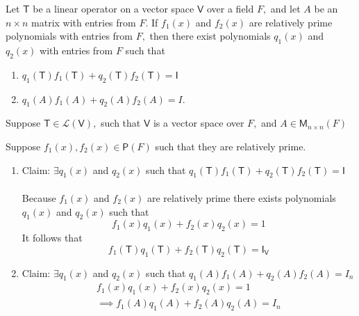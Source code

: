 Let $\mathsf{T}$ be a linear operator on a vector space $\mathsf{V}$
over a field $F,$ and let $A$ be an $n\times n$ matrix with entries
from $F.$ If $f_1(x)$ and $f_2(x)$ are relatively prime polynomials
with entries from $F,$ then there exist polynomials $q_1(x)$ and
$q_2(x)$ with entries from $F$ such that
\begin{enumerate}
\item $q_1(\mathsf{T})f_1(\mathsf{T}) + q_2(\mathsf{T})f_2(\mathsf{T})
  = \mathsf{I}$
\item$q_1(A)f_1(A) + q_2(A)f_2(A) = I.$
\end{enumerate}
Suppose $\mathsf{T} \in \mathcal{L}(\mathsf{V}),$ such that
$\mathsf{V}$ is a vector space over $F,$ and $A\in
\mathsf{M}_{n\times n}(F)$

Suppose $f_1(x), f_2(x) \in \mathsf{P}(F)$ such that they are
relatively prime.
\begin{enumerate}
\item Claim: $ \exists q_1(x)$ and $q_2(x)$ such that
  $q_1(\mathsf{T})f_1(\mathsf{T}) + q_2(\mathsf{T})f_2(\mathsf{T}) =
  \mathsf{I}$ 
\paragraph{}
Because $f_1(x)$ and $f_2(x)$ are relatively prime there exists
polynomials $q_1(x)$ and $q_2(x)$ such that 
\begin{equation}
f_1(x)q_1(x) + f_2(x)q_2(x) = 1
\end{equation}
It follows that 
\begin{equation}
f_1(\mathsf{T})q_1(\mathsf{T}) + f_2(\mathsf{T})q_2(\mathsf{T}) = \mathsf{I}_\mathsf{V}
\end{equation}
\item Claim: $\exists q_1(x)$ and $q_2(x)$ such that $q_1(A)f_1(A) +
  q_2(A)f_2(A) = I_n$
\begin{gather}
f_1(x)q_1(x) + f_2(x)q_2(x) = 1\\
\implies f_1(A)q_1(A) + f_2(A)q_2(A) = I_n
\end{gather}
\end{enumerate}
